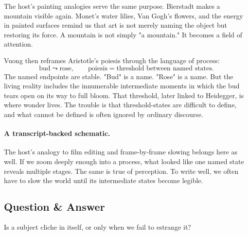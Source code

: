 The host's painting analogies serve the same purpose. Bierstadt makes a mountain visible again. Monet's water lilies, Van Gogh's flowers, and the energy in painted surfaces remind us that art is not merely naming the object but restoring its force. A mountain is not simply "a mountain." It becomes a field of attention.

Vuong then reframes Aristotle's poiesis through the language of process:
\begin{equation}
\text{bud} \leadsto \text{rose}, \qquad \text{poiesis} = \text{threshold between named states}.
\end{equation}
The named endpoints are stable. "Bud" is a name. "Rose" is a name. But the living reality includes the innumerable intermediate moments in which the bud tears open on its way to full bloom. That threshold, later linked to Heidegger, is where wonder lives. The trouble is that threshold-states are difficult to define, and what cannot be defined is often ignored by ordinary discourse.

\paragraph{A transcript-backed schematic.}
\begin{figure}
\begin{center}
\end{center}
\end{figure}

The host's analogy to film editing and frame-by-frame slowing belongs here as well. If we zoom deeply enough into a process, what looked like one named state reveals multiple stages. The same is true of perception. To write well, we often have to slow the world until its intermediate states become legible.

\subsection{Question \& Answer}

Is a subject cliche in itself, or only when we fail to estrange it?

